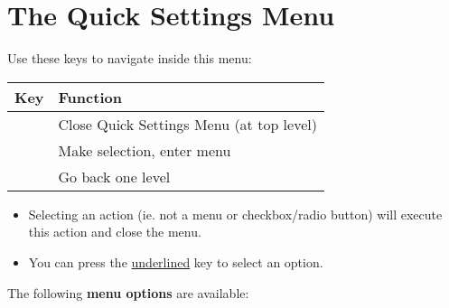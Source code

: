 \section{The Quick Settings Menu}
\label{quicksettings}

Use these keys to navigate inside this menu:

\begin{tabular}{p{6em} | p{}}
\hline
\textbf{Key}	& \textbf{Function} \\
\hline
\LKeyEsc		& Close Quick Settings Menu (at top level)\\
\hline
\LKeySpace		& \multirow{3}{*}{Make selection, enter menu} \\
\LKeyEnter		& \\
\LKeyRight		& \\
\hline
\LKeyEsc		& \multirow{3}{*}{Go back one level} \\
\LKeyBack		& \\
\LKeyLeft		& \\
\hline
\end{tabular}

\begin{itemize}[leftmargin=1em]
 \item Selecting an action (ie. not a menu or checkbox/radio button) will execute this action and close the menu.
 \item You can press the \underline{underlined} key to select an option.
\end{itemize}

The following \textbf{menu options} are available:


